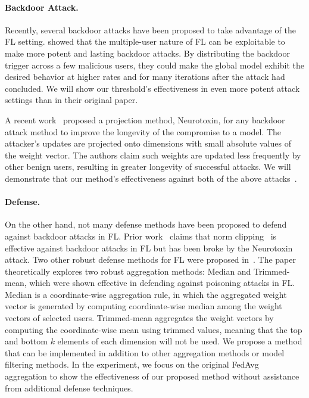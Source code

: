 \documentclass{article} %
\newcommand{\yli}[1]{{\color{cyan}#1}}
\begin{document}
\paragraph{Backdoor Attack.} Recently, several backdoor attacks have been proposed to take advantage of the FL setting. \cite{dba} showed that the multiple-user nature of FL can be exploitable to make more potent and lasting backdoor attacks. By distributing the backdoor trigger across a few malicious users, they could make the global model exhibit the desired behavior at higher rates and for many iterations after the attack had concluded. We will show our threshold's effectiveness in even more potent attack settings than in their original paper. 

A recent work~\citep{neurotoxin} proposed a projection method, Neurotoxin, for any backdoor attack method to improve the longevity of the compromise to a model. The attacker's updates are projected onto \yli{dimensions with small absolute values of the weight vector}.
The authors claim such weights are updated less frequently by other benign users, resulting in greater longevity of successful attacks. We will demonstrate that our method's effectiveness against both of the above attacks~\citep{dba,neurotoxin}.

\vspace{-10pt}
\paragraph{Defense.} \yli{On the other hand, not many defense methods have been proposed to defend against backdoor attacks in FL. Prior work~\citep{shejwalkar2022back} claims that norm clipping~\citep{sun2019can} is effective against backdoor attacks in FL but has been broke by the Neurotoxin attack.}
Two other robust defense methods for FL were proposed in~\citep{trim-mean}. The paper theoretically explores two robust aggregation methods: Median and Trimmed-mean, which were shown effective in defending against poisoning attacks in FL. Median is a coordinate-wise aggregation rule, in which the aggregated weight vector is generated by computing coordinate-wise median among the weight vectors of selected users. Trimmed-mean aggregates the weight vectors by computing the coordinate-wise mean using trimmed values, meaning that the top and bottom $k$ elements of each dimension will not be used.
We propose a method that can be implemented in addition to other aggregation methods or model filtering methods. In the experiment, we focus on the original FedAvg~\citep{fedavg} aggregation to show the effectiveness of our proposed method without assistance from additional defense techniques. 
\end{document}
